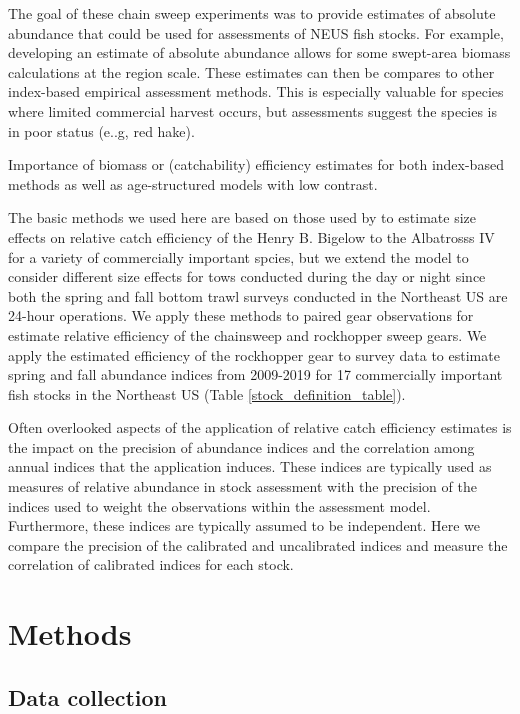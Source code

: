 \documentclass[]{article}
\begin{document}
The goal of these chain sweep experiments was to provide estimates of
absolute abundance that could be used for assessments of NEUS fish
stocks. For example, developing an estimate of absolute abundance allows
for some swept-area biomass calculations at the region scale. These
estimates can then be compares to other index-based empirical assessment
methods. This is especially valuable for species where limited
commercial harvest occurs, but assessments suggest the species is in
poor status (e..g, red hake).

Importance of biomass or (catchability) efficiency estimates for both
index-based methods as well as age-structured models with low contrast.

The basic methods we used here are based on those used by
\citet{miller13} to estimate size effects on relative catch efficiency
of the Henry B. Bigelow to the Albatrosss IV for a variety of
commercially important spcies, but we extend the model to consider
different size effects for tows conducted during the day or night since
both the spring and fall bottom trawl surveys conducted in the Northeast
US are 24-hour operations. We apply these methods to paired gear
observations for estimate relative efficiency of the chainsweep and
rockhopper sweep gears. We apply the estimated efficiency of the
rockhopper gear to survey data to estimate spring and fall abundance
indices from 2009-2019 for 17 commercially important fish stocks in the
Northeast US (Table \ref{stock_definition_table}).

Often overlooked aspects of the application of relative catch efficiency
estimates is the impact on the precision of abundance indices and the
correlation among annual indices that the application induces. These
indices are typically used as measures of relative abundance in stock
assessment with the precision of the indices used to weight the
observations within the assessment model. Furthermore, these indices are
typically assumed to be independent. Here we compare the precision of
the calibrated and uncalibrated indices and measure the correlation of
calibrated indices for each stock.

\hypertarget{methods}{%
\section{Methods}\label{methods}}

\hypertarget{data-collection}{%
\subsection{Data collection}\label{data-collection}}
\end{document}
